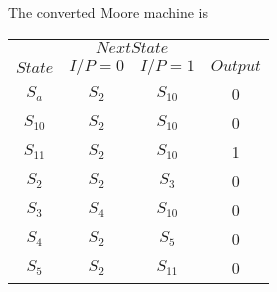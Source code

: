 \documentclass[8pt]{beamer}
\begin{document}
\begin{frame}
\hspace*{0.5cm}The converted Moore machine is\\

\vspace*{0.4cm}
\begin{center}
\begin{tabular}{cccc}
 \hline

 \hline

 \hline

 \hline
 & \multicolumn{2}{c}{$Next State$}\\
 \cline{2-3}
 $State$ &  $I/P=0$ & $I/P=1$  &  $Output$\\
\hline
$S_a$  & $S_2$   & $S_10$ & 0\\
$S_10$ & $S_2$  & $S_10$ & 0\\
$S_11$ & $S_2$  & $S_10$& 1\\
$S_2$  & $S_2$   & $S_3$  & 0\\
$S_3$  & $S_4$   & $S_10$ & 0\\
$S_4$  & $S_2$   & $S_5$  & 0\\
$S_5$  & $S_2$   & $S_11$ & 0\\
 \hline

 \hline

 \hline

 \hline
\end{tabular}
\end{center}
\end{frame}
\end{document}
